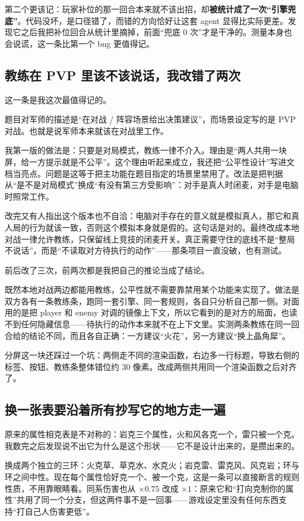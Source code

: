 第二个更该记：玩家补位的那一回合本来就不该出招，却\textbf{被统计成了一次“引擎兜底”}。代码没坏，是口径错了，而错的方向恰好让这套 agent 显得比实际更差。发现它之后我把补位回合从统计里摘掉，前面“兜底 0 次”才是干净的。测量本身也会说谎，这一条比第一个 bug 更值得记。

\subsection{教练在 PVP 里该不该说话，我改错了两次}

这一条是我这次最值得记的。

题目对军师的描述是“在对战 / 阵容场景给出决策建议”，而场景设定写的是 PVP 对战。也就是说军师本来就该在对战里工作。

我第一版的做法是：只要是对局模式，教练一律不介入。理由是“两人共用一块屏，给一方提示就是不公平”。这个理由听起来成立，我还把“公平性设计”写进文档当亮点。问题是这等于把主功能在题目指定的场景里禁用了。改法是把判据从“是不是对局模式”换成“有没有第三方受影响”：对手是真人时闭麦，对手是电脑时照常工作。

改完又有人指出这个版本也不自洽：电脑对手存在的意义就是模拟真人，那它和真人局的行为就该一致，否则这个模拟本身就是假的。这句话是对的。最终改成本地对战一律允许教练，只保留线上竞技的闭麦开关。真正需要守住的底线不是“整局不说话”，而是“不读取对方待执行的动作”——那条项目一直没破，也有测试。

前后改了三次，前两次都是我把自己的推论当成了结论。

既然本地对战两边都能用教练，公平性就不需要靠禁用某个功能来实现了。做法是双方各有一条教练条，跑同一套引擎、同一套规则，各自只分析自己那一侧。对面用的是把 player 和 enemy 对调的镜像上下文，所以它看到的是对方的局面，也读不到任何隐藏信息——待执行的动作本来就不在上下文里。实测两条教练在同一回合给的结论不同，而且各自正确：一方建议“火花”，另一方建议“换上晶角犀”。

分屏这一块还踩过一个坑：两侧走不同的渲染函数，右边多一行标题，导致右侧的标签、按钮、教练条整体错位约 30 像素。改成两侧共用同一个渲染函数之后对齐了。

\subsection{换一张表要沿着所有抄写它的地方走一遍}

原来的属性相克表是不对称的：岩克三个属性，火和风各克一个，雷只被一个克。我数完之后发现说不出它为什么是这个形状——它不是设计出来的，是攒出来的。

换成两个独立的三环：火克草、草克水、水克火；岩克雷、雷克风、风克岩；环与环之间中性。现在每个属性恰好克一个、被一个克，这是一条可以直接断言的规则性质，不用靠眼睛看。同系伤害也从 $\times 0.75$ 改成 $\times 1$：原来它和“打向克制你的属性”共用了同一个分支，但这两件事不是一回事——游戏设定里没有任何东西支持“打自己人伤害更低”。

